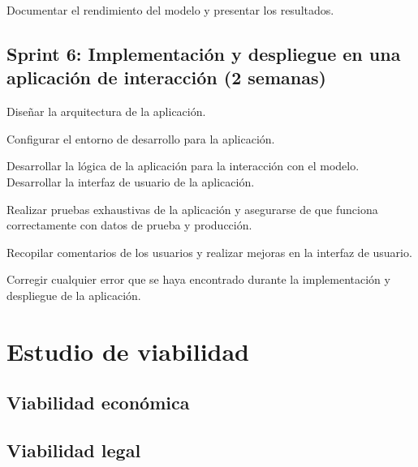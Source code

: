 Documentar el rendimiento del modelo y presentar los resultados.

\subsection{Sprint 6: Implementación y despliegue en una aplicación de interacción (2 semanas)}

Diseñar la arquitectura de la aplicación.

Configurar el entorno de desarrollo para la aplicación.

Desarrollar la lógica de la aplicación para la interacción con el modelo.
Desarrollar la interfaz de usuario de la aplicación.

Realizar pruebas exhaustivas de la aplicación y asegurarse de que funciona correctamente con datos de prueba y producción.

Recopilar comentarios de los usuarios y realizar mejoras en la interfaz de usuario.

Corregir cualquier error que se haya encontrado durante la implementación y despliegue de la aplicación.

\section{Estudio de viabilidad}

\subsection{Viabilidad económica}

\subsection{Viabilidad legal}


